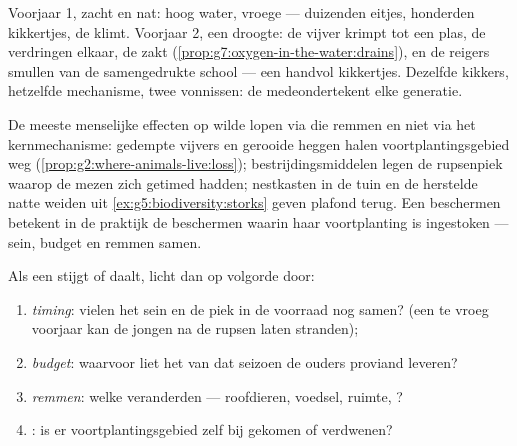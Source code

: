 \begin{example}\label{ex:g8:reproduction-and-environment:twosprings}
Voorjaar 1, zacht en nat: hoog water, vroege  --- duizenden
eitjes, honderden kikkertjes, de  klimt. Voorjaar 2, een droogte:
de vijver krimpt tot een plas, de  verdringen elkaar, de
 zakt (\cref{prop:g7:oxygen-in-the-water:drains}), en de reigers
smullen van de samengedrukte school --- een handvol kikkertjes. Dezelfde
kikkers, hetzelfde mechanisme, twee vonnissen: de 
medeondertekent elke generatie.
\end{example}

\begin{remark}\label{rem:g8:reproduction-and-environment:humans}
De meeste menselijke effecten op wilde  lopen via die remmen en niet
via het kernmechanisme: gedempte vijvers en gerooide heggen halen
voortplantingsgebied weg
(\cref{prop:g2:where-animals-live:loss}); bestrijdingsmiddelen legen de
rupsenpiek waarop de mezen zich getimed hadden; nestkasten in de tuin en
de herstelde natte weiden uit \cref{ex:g5:biodiversity:storks} geven
plafond terug. Een  beschermen betekent in de praktijk de 
beschermen waarin haar voortplanting is ingestoken --- sein, budget en
remmen samen.
\end{remark}

\begin{method}\label{met:g8:reproduction-and-environment:audit}
Als een  stijgt of daalt, licht dan op volgorde door:
\begin{enumerate}
  \item \emph{timing}: vielen het sein en de piek in de voorraad nog
        samen? (een te vroeg voorjaar kan de jongen na de rupsen laten
        stranden);
  \item \emph{budget}: waarvoor liet het  van dat seizoen de
        ouders proviand leveren?
  \item \emph{remmen}: welke veranderden --- roofdieren, voedsel, ruimte,
        ?
  \item \emph{}: is er voortplantingsgebied zelf bij gekomen of
        verdwenen?
\end{enumerate}
\end{method}

